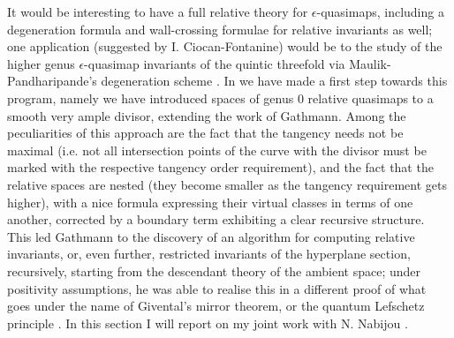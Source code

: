 It would be interesting to have a full relative theory for $\epsilon$-quasimaps, including a degeneration formula and wall-crossing formulae for relative invariants as well; one application (suggested by I. Ciocan-Fontanine) would be to the study of the higher genus $\epsilon$-quasimap invariants of the quintic threefold via Maulik-Pandharipande's degeneration scheme \cite{MauPan}. In \cite{BN} we have made a first step towards this program, namely we have introduced spaces of genus $0$ relative quasimaps to a smooth very ample divisor, extending the work of Gathmann. Among the peculiarities of this approach are the fact that the tangency needs not be maximal (i.e. not all intersection points of the curve with the divisor must be marked with the respective tangency order requirement), and the fact that the relative spaces are nested (they become smaller as the tangency requirement gets higher), with a nice formula expressing their virtual classes in terms of one another, corrected by a boundary term exhibiting a clear recursive structure. This led Gathmann to the discovery of an algorithm for computing relative invariants, or, even further, restricted invariants of the hyperplane section, recursively, starting from the descendant theory of the ambient space; under positivity assumptions, he was able to realise this in a different proof of what goes under the name of Givental's mirror theorem, or the quantum Lefschetz principle \cite{Ga-MF}. In this section I will report on my joint work with N. Nabijou \cite{BN}.

